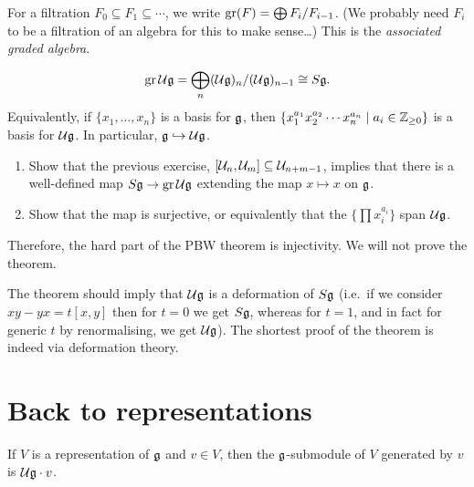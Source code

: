\begin{definition}
For a filtration $F_0 \subseteq F_1 \subseteq \cdots$, we write
$\operatorname{gr}(F) = \bigoplus F_i/F_{i-1}$. (We probably need $F_i$ to be a filtration
of an algebra for this to make sense\dots) This is the \emph{associated graded
algebra}.
\end{definition}

\begin{theorem}
\[
  \operatorname{gr} \mathcal{U}\mathfrak{g} = \bigoplus_n (\mathcal{U}\mathfrak{g})_n/(\mathcal{U}\mathfrak{g})_{n-1} \cong S\mathfrak{g}.
\]
Equivalently, if $\{x_1, \dots, x_n\}$ is a basis for $\mathfrak{g}$, then
$\{x_1^{a_1}x_2^{a_2}\cdots x_n^{a_n} \mid a_i \in \mathbb{Z}_{\geq 0}\}$ is a basis for
$\mathcal{U}\mathfrak{g}$. In particular, $\mathfrak{g} \hookrightarrow \mathcal{U}\mathfrak{g}$.
\end{theorem}

\begin{exercise}\leavevmode
\begin{enumerate}
  \item Show that the previous exercise,
    $[\mathcal{U}_n, \mathcal{U}_m] \subseteq \mathcal{U}_{n+m-1}$, implies that there is a well-defined
    map $S\mathfrak{g} \to \operatorname{gr} \mathcal{U}\mathfrak{g}$ extending the map $x \mapsto x$ on $\mathfrak{g}$.
  \item Show that the map is surjective, or equivalently that the
    $\{\prod x_i^{a_i}\}$ span $\mathcal{U}\mathfrak{g}$.
\end{enumerate}
\end{exercise}

Therefore, the hard part of the PBW theorem is injectivity. We will not prove
the theorem.

\begin{remark}
The theorem should imply that $\mathcal{U}\mathfrak{g}$ is a deformation of $S\mathfrak{g}$ (i.e.\ if we
consider $xy - yx = t[x, y]$ then for $t = 0$ we get $S\mathfrak{g}$, whereas for
$t = 1$, and in fact for generic $t$ by renormalising, we get $\mathcal{U}\mathfrak{g}$). The
shortest proof of the theorem is indeed via deformation theory.
\end{remark}

\section{Back to representations}

\begin{exercise}
If $V$ is a representation of $\mathfrak{g}$ and $v \in V$, then the $\mathfrak{g}$-submodule of
$V$ generated by $v$ is $\mathcal{U}\mathfrak{g} \cdot v$.
\end{exercise}


